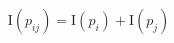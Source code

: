 \documentclass[preview]{standalone}
\begin{document}
\begin{align*}
\mathrm{I}(p_{ij}) = \mathrm{I}(p_i) + \mathrm{I}(p_j)
\end{align*}
\end{document}
